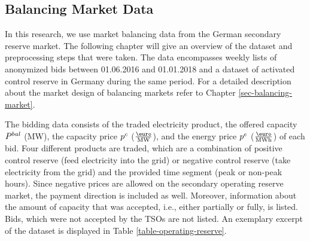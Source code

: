 \documentclass[a4paper, 12pt]{article}
\begin{document}
\subsection{Balancing Market Data \label{sec-data-balancing}}
\label{sec:orgad9c19a}
In this research, we use market balancing data from the German secondary reserve
market. The following chapter will give an overview of the dataset and
preprocessing steps that were taken. The data encompasses weekly lists of
anonymized bids between 01.06.2016 and 01.01.2018 and a dataset of activated
control reserve in Germany during the same period. For a detailed description
about the market design of balancing markets refer to Chapter
\ref{sec-balancing-market}.

The bidding data consists of the traded electricity product, the offered
capacity \(P^{bal}_{}\) (MW), the capacity price \(p^c_{}\) (\(\emw\)), and the
energy price \(p^e_{}\) (\(\emwh\)) of each bid. Four different products
are traded, which are a combination of positive control reserve (feed
electricity into the grid) or negative control reserve (take electricity from
the grid) and the provided time segment (peak or non-peak hours). Since negative
prices are allowed on the secondary operating reserve market, the payment
direction is included as well. Moreover, information about the amount of
capacity that was accepted, i.e., either partially or fully, is listed. Bids,
which were not accepted by the TSOs are not listed. An exemplary excerpt of the
dataset is displayed in Table \ref{table-operating-reserve}.
\end{document}
